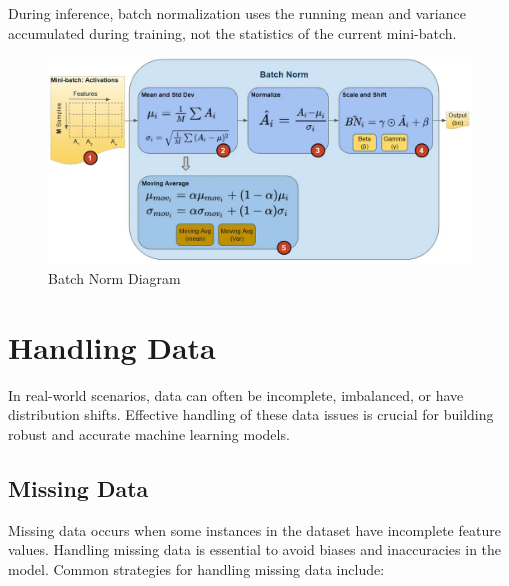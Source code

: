 \documentclass[12pt]{article}
\begin{document}
During inference, batch normalization uses the running mean and variance accumulated during training, not the statistics of the current mini-batch.

\begin{figure}[h]
    \centering
    \includegraphics[scale=0.4]{./media/batch_norm.png}
    \caption{Batch Norm Diagram}
    \label{fig:BN}
\end{figure}

\section{Handling Data}

In real-world scenarios, data can often be incomplete, imbalanced, or have distribution shifts. Effective handling of these data issues is crucial for building robust and accurate machine learning models.

\subsection{Missing Data}

Missing data occurs when some instances in the dataset have incomplete feature values. Handling missing data is essential to avoid biases and inaccuracies in the model. Common strategies for handling missing data include:
\end{document}

